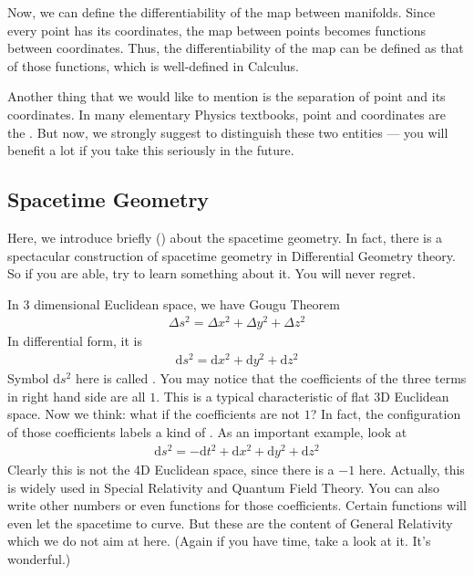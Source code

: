 \documentclass[letterpaper,10pt,english]{sphinxmanual}
\begin{document}
Now, we can define the differentiability of the map between manifolds. Since every point has its coordinates, the map between points becomes functions between coordinates. Thus, the differentiability of the map can be defined as that of those functions, which is well-defined in Calculus.

Another thing that we would like to mention is the separation of point and its coordinates. In many elementary Physics textbooks, point and coordinates are the . But now, we strongly suggest to distinguish these two entities — you will benefit a lot if you take this seriously in the future.


\subsection{Spacetime Geometry}
\label{\detokenize{bg_diff_geo:spacetime-geometry}}
Here, we introduce briefly () about the spacetime geometry. In fact, there is a spectacular construction of spacetime geometry in Differential Geometry theory. So if you are able, try to learn something about it. You will never regret.

In 3 dimensional Euclidean space, we have Gougu Theorem
\begin{equation*}
\begin{split}\Delta s^2 = \Delta x^2 + \Delta y^2 + \Delta z^2\end{split}
\end{equation*}
In differential form, it is
\begin{equation*}
\begin{split}\mathrm d s^2 = \mathrm d x^2 + \mathrm d y^2 + \mathrm d z^2\end{split}
\end{equation*}
Symbol \(\mathrm d s^2\) here is called . You may notice that the coefficients of the three terms in right hand side are all \(1\). This is a typical characteristic of flat 3D Euclidean space. Now we think: what if the coefficients are not \(1\)? In fact, the configuration of those coefficients labels a kind of . As an important example, look at
\begin{equation*}
\begin{split}\mathrm d s^2 = -\mathrm d t^2 + \mathrm d x^2 + \mathrm d y^2 + \mathrm d z^2\end{split}
\end{equation*}
Clearly this is not the 4D Euclidean space, since there is a \(-1\) here. Actually, this is  widely used in Special Relativity and Quantum Field Theory. You can also write other numbers or even functions for those coefficients. Certain functions will even let the spacetime to curve. But these are the content of General Relativity which we do not aim at here. (Again if you have time, take a look at it. It’s wonderful.)
\end{document}
